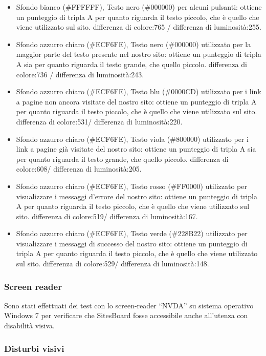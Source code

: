 \documentclass[12pt]{article}
\begin{document}
\begin{itemize}
\item Sfondo bianco (\#FFFFFF), Testo nero (\#000000) per alcuni pulsanti: ottiene un punteggio di tripla A per quanto riguarda il testo  piccolo, che è quello che viene utilizzato sul sito. differenza di colore:765 / differenza di luminosità:255.
\item Sfondo azzurro chiaro (\#ECF6FE), Testo nero (\#000000) utilizzato per la maggior parte del testo presente nel nostro sito: ottiene un punteggio di tripla A sia per quanto riguarda il testo grande, che quello piccolo. differenza di colore:736 / differenza di luminosità:243.
\item Sfondo azzurro chiaro (\#ECF6FE), Testo blu (\#0000CD) utilizzato per i link a pagine non ancora visitate del nostro sito: ottiene un punteggio di tripla A per quanto riguarda il testo piccolo, che è quello che viene utilizzato sul sito. differenza di colore:531/ differenza di luminosità:220.
\item Sfondo azzurro chiaro (\#ECF6FE), Testo viola (\#800000) utilizzato per i link a pagine già visitate del nostro sito: ottiene un punteggio di tripla A sia per quanto riguarda il testo grande, che quello piccolo. differenza di colore:608/ differenza di luminosità:205.
\item Sfondo azzurro chiaro (\#ECF6FE), Testo rosso (\#FF0000) utilizzato per visualizzare i messaggi d'errore del nostro sito: ottiene un punteggio di tripla A per quanto riguarda il testo piccolo, che è quello che viene utilizzato sul sito. differenza di colore:519/ differenza di luminosità:167.
\item Sfondo azzurro chiaro (\#ECF6FE), Testo verde (\#228B22) utilizzato per visualizzare i messaggi di successo del nostro sito: ottiene un punteggio di tripla A per quanto riguarda il testo piccolo, che è quello che viene utilizzato sul sito. differenza di colore:529/ differenza di luminosità:148.
\end{itemize}
		
		\subsubsection{Screen reader}
		
		Sono stati effettuati dei test con lo screen-reader “NVDA” su sistema operativo Windows 7 per verificare che SitesBoard fosse accessibile anche all’utenza con disabilità visiva. 
		
		\subsubsection{Disturbi visivi}
		
\end{document}
